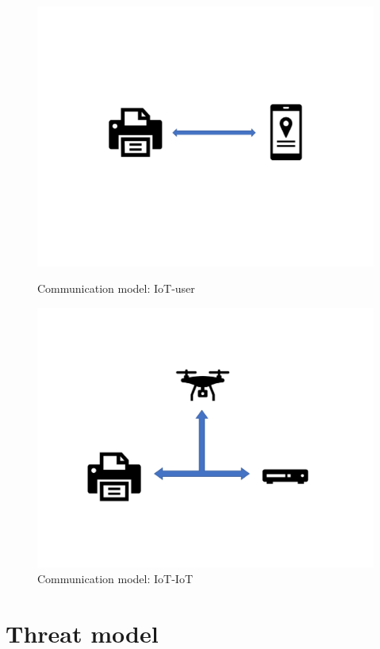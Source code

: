\begin{figure}
	\begin{minipage}[t]{0.5\linewidth}
		\includegraphics[width=\linewidth]{comm_model_1.pdf}
		\caption{Communication model: IoT-user}
		\label{fig:cm1}
	\end{minipage}
	\begin{minipage}[t]{0.5\linewidth}
		\includegraphics[width=\linewidth]{comm_model_2.pdf}
		\caption{Communication model: IoT-IoT}
		\label{fig:cm2}
	\end{minipage}
\end{figure}

\section{Threat model}

